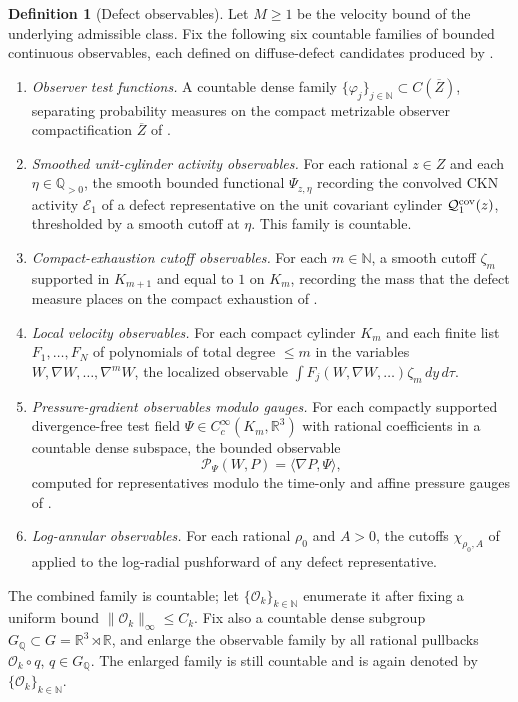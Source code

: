 \documentclass[11pt]{amsart}
\numberwithin{equation}{section}
\theoremstyle{plain}
\theoremstyle{definition}
\newtheorem{definition}[definition]{Definition}
\theoremstyle{remark}
\newcommand{\calE}{\mathcal E}
\begin{document}
\begin{definition}[Defect observables]
\label{def:diffuse-defect-observables}
Let \(M\ge 1\) be the velocity bound of the underlying admissible class.
Fix the following six countable families of bounded continuous observables,
each defined on diffuse-defect candidates produced by
.
\begin{enumerate}[label=\textup{(\arabic*)},leftmargin=2.2em]
   \item \emph{Observer test functions.} A countable dense family
   \(\{\varphi_j\}_{j\in\mathbb N}\subset C(\overline Z)\), separating
   probability measures on the compact metrizable observer compactification
   \(\overline Z\) of .
   \item \emph{Smoothed unit-cylinder activity observables.} For each rational
   \(z\in Z\) and each \(\eta\in\mathbb Q_{>0}\), the smooth bounded functional
   \(\Psi_{z,\eta}\) recording the convolved CKN activity \(\calE_1\) of a
   defect representative on the unit covariant cylinder
   \(\mathcal Q_1^{\rm cov}(z)\), thresholded by a smooth cutoff at
   \(\eta\).  This family is countable.
   \item \emph{Compact-exhaustion cutoff observables.} For each
   \(m\in\mathbb N\), a smooth cutoff \(\zeta_m\) supported in \(K_{m+1}\)
   and equal to \(1\) on \(K_m\), recording the mass that the defect measure
   places on the compact exhaustion of .
   \item \emph{Local velocity observables.} For each compact cylinder
   \(K_m\) and each finite list \(F_1,\dots,F_N\) of polynomials of total
   degree \(\le m\) in the variables \(W,\nabla W,\dots,\nabla^m W\), the
   localized observable \(\int F_j(W,\nabla W,\dots)\zeta_m\,dy\,d\tau\).
   \item \emph{Pressure-gradient observables modulo gauges.} For each
   compactly supported divergence-free test field
   \(\Psi\in C_c^\infty(K_m,\mathbb R^3)\) with rational coefficients in a
   countable dense subspace, the bounded observable
   \[
      \mathcal P_\Psi(W,P)=\langle \nabla P,\Psi\rangle ,
   \]
   computed for representatives modulo the time-only and affine pressure
   gauges of .
   \item \emph{Log-annular observables.} For each rational \(\rho_0\) and
   \(A>0\), the cutoffs
   \(\chi_{\rho_0,A}\) of  applied
   to the log-radial pushforward of any defect representative.
\end{enumerate}
The combined family is countable; let \(\{\mathcal O_k\}_{k\in\mathbb N}\)
enumerate it after fixing a uniform bound \(\|\mathcal O_k\|_\infty\le C_k\).
Fix also a countable dense subgroup \(G_{\mathbb Q}\subset G=\mathbb R^3\rtimes
\mathbb R\), and enlarge the observable family by all rational pullbacks
\(\mathcal O_k\circ q\), \(q\in G_{\mathbb Q}\).  The enlarged family is still
countable and is again denoted by \(\{\mathcal O_k\}_{k\in\mathbb N}\).
\end{definition}
\end{document}
